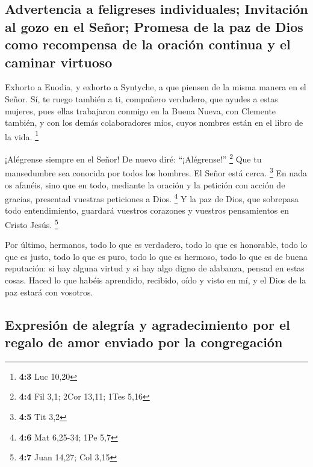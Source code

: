 \hypertarget{advertencia-a-feligreses-individuales-invitaciuxf3n-al-gozo-en-el-seuxf1or-promesa-de-la-paz-de-dios-como-recompensa-de-la-oraciuxf3n-continua-y-el-caminar-virtuoso}{%
\subsection{Advertencia a feligreses individuales; Invitación al gozo en
el Señor; Promesa de la paz de Dios como recompensa de la oración
continua y el caminar
virtuoso}\label{advertencia-a-feligreses-individuales-invitaciuxf3n-al-gozo-en-el-seuxf1or-promesa-de-la-paz-de-dios-como-recompensa-de-la-oraciuxf3n-continua-y-el-caminar-virtuoso}}

 Exhorto a Euodia, y exhorto a Syntyche, a que piensen de
la misma manera en el Señor.  Sí, te ruego también a ti,
compañero verdadero, que ayudes a estas mujeres, pues ellas trabajaron
conmigo en la Buena Nueva, con Clemente también, y con los demás
colaboradores míos, cuyos nombres están en el libro de la vida.
\footnote{\textbf{4:3} Luc 10,20}

 ¡Alégrense siempre en el Señor! De nuevo diré:
``¡Alégrense!'' \footnote{\textbf{4:4} Fil 3,1; 2Cor 13,11; 1Tes 5,16}
 Que tu mansedumbre sea conocida por todos los hombres. El
Señor está cerca. \footnote{\textbf{4:5} Tit 3,2}  En nada
os afanéis, sino que en todo, mediante la oración y la petición con
acción de gracias, presentad vuestras peticiones a Dios. \footnote{\textbf{4:6}
  Mat 6,25-34; 1Pe 5,7}  Y la paz de Dios, que sobrepasa
todo entendimiento, guardará vuestros corazones y vuestros pensamientos
en Cristo Jesús. \footnote{\textbf{4:7} Juan 14,27; Col 3,15}

 Por último, hermanos, todo lo que es verdadero, todo lo
que es honorable, todo lo que es justo, todo lo que es puro, todo lo que
es hermoso, todo lo que es de buena reputación: si hay alguna virtud y
si hay algo digno de alabanza, pensad en estas cosas. 
Haced lo que habéis aprendido, recibido, oído y visto en mí, y el Dios
de la paz estará con vosotros.

\hypertarget{expresiuxf3n-de-alegruxeda-y-agradecimiento-por-el-regalo-de-amor-enviado-por-la-congregaciuxf3n}{%
\subsection{Expresión de alegría y agradecimiento por el regalo de amor
enviado por la
congregación}\label{expresiuxf3n-de-alegruxeda-y-agradecimiento-por-el-regalo-de-amor-enviado-por-la-congregaciuxf3n}}

